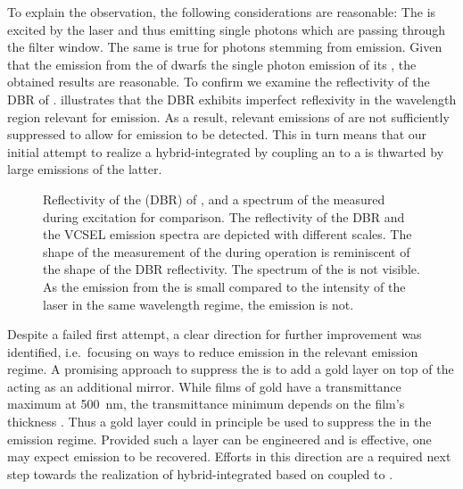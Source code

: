 		To explain the observation, the following considerations are reasonable: The \siv is excited by the \VCSELs laser and thus emitting single photons which are passing through the filter window. The same is true for photons stemming from \VCSEL \sb emission. Given that the emission from the \sb of \BmFour dwarfs the single photon emission of its \siv, the obtained results are reasonable.
		To confirm we examine the reflectivity of the DBR of \BmFour.  illustrates that the DBR exhibits imperfect reflexivity in the wavelength region relevant for \siv emission. As a result, relevant \sb emissions of \BmFour are not sufficiently suppressed to allow for \siv emission to be detected. This in turn means that our initial attempt to realize a hybrid-integrated \sps by coupling an \siv to a \VCSELs is thwarted by large \sb emissions of the latter.

		\begin{figure}[htp]
			\centering
			\caption[Reflectivity of \BmFour]{Reflectivity of the \dbr (DBR) of \BmFour \cite{Weidenfeld2012}, and a spectrum of the \siv measured during \VCSEL excitation for comparison. The reflectivity of the DBR and the VCSEL emission spectra are depicted with different scales. The shape of the measurement of the \siv during \VCSEL operation is reminiscent of the shape of the DBR reflectivity. The spectrum of the \siv is not visible. As the emission from the \siv is small compared to the intensity of the laser \sb in the same wavelength regime, the \sivs emission is not.}
			\label{fig::dbr_vcsel}
		\end{figure}

		Despite a failed first attempt, a clear direction for further improvement was identified, i.e.\ focusing on ways to reduce \VCSEL \sb emission in the relevant \siv emission regime. A promising approach to suppress the \sb is to add a gold layer on top of the \VCSEL acting as an additional mirror. While films of gold have a transmittance maximum at \SI{500}{nm}, the transmittance minimum depends on the film's thickness \cite{Axelevitch2012}. Thus a gold layer could in principle be used to suppress the \VCSEL \sb in the \siv emission regime. Provided such a layer can be engineered and is effective, one may expect \siv emission to be recovered. Efforts in this direction are a required next step towards the realization of hybrid-integrated \spss based on \sivs coupled to \VCSELs.
